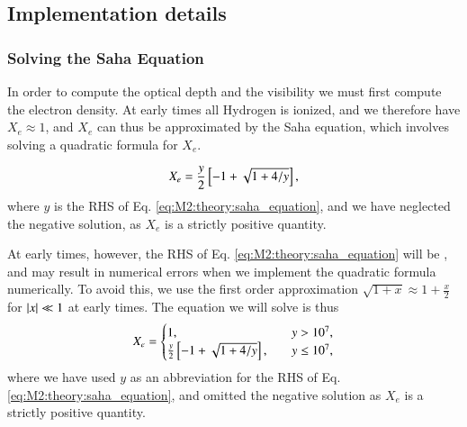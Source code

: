 
\subsection{Implementation details}\label{ssec:M2:implementations} 

\subsubsection{Solving the Saha Equation}\label{sssec:M2:implementations:solving_saha}

In order to compute the optical depth and the visibility we must first compute the electron density. At early times all Hydrogen is ionized, and we therefore have $X_e\approx 1$, and $X_e$ can thus be approximated by the Saha equation, which involves solving a quadratic formula for $X_e$. 

\begin{equation} \label{eq:M2:implementations:Xe_saha_quadratic_formula}
    X_e = \frac{y}{2}\left[ -1 + \sqrt{1 + 4/y} \right],
\end{equation}
where $y$ is the RHS of Eq. \eqref{eq:M2:theory:saha_equation}, and we have neglected the negative solution, as $X_e$ is a strictly positive quantity. 

At early times, however, the RHS of Eq. \eqref{eq:M2:theory:saha_equation} will be , and may result in numerical errors when we implement the quadratic formula numerically. To avoid this, we use the first order approximation $\sqrt{1+x}\approx 1 + \frac{x}{2}$ for $\abs{x}\ll1$ at early times. The equation we will solve is thus 
\begin{equation}
    X_e = \begin{cases}
        1, \quad & y>10^7, \\
        \frac{y}{2}\left[ -1 + \sqrt{1 + 4/y} \right],\quad & y\leq 10^7,
    \end{cases}
\end{equation}  
where we have used $y$ as an abbreviation for the RHS of Eq. \eqref{eq:M2:theory:saha_equation}, and omitted the negative solution as $X_e$ is a strictly positive quantity. 
